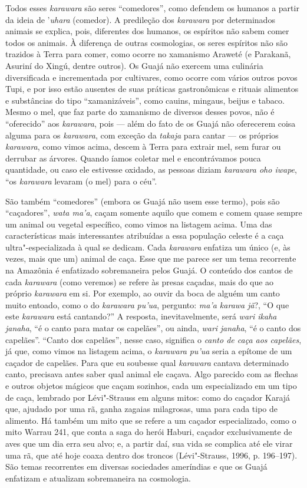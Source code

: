 Todos esses \emph{karawara} são seres ``comedores'', como defendem os
humanos a partir da ideia de '\emph{uhara} (comedor). A predileção dos
\emph{karawara} por determinados animais se explica, pois, diferentes
dos humanos, os espíritos não sabem comer todos os animais. À diferença
de outras cosmologias, os seres espíritos não são trazidos à Terra para
comer, como ocorre no xamanismo Araweté (e Parakanã, Asuriní do Xingú,
dentre outros). Os Guajá não exercem uma culinária diversificada e
incrementada por cultivares, como ocorre com vários outros povos Tupi, e
por isso estão ausentes de suas práticas gastronômicas e rituais
alimentos e substâncias do tipo ``xamanizáveis'', como cauins, mingaus,
beijus e tabaco. Mesmo o mel, que faz parte do xamanismo de diversos
desses povos, não é ``oferecido'' aos \emph{karawara}, pois --- além do fato
de os Guajá não oferecerem coisa alguma para os \emph{karawara}, com
exceção da \emph{takaja} para cantar --- os próprios \emph{karawara}, como
vimos acima, descem à Terra para extrair mel, sem furar ou derrubar as
árvores. Quando íamos coletar mel e encontrávamos pouca quantidade, ou
caso ele estivesse oxidado, as pessoas diziam \emph{karawara oho iwape},
``os \emph{karawara} levaram (o mel) para o céu''.

São também ``comedores'' (embora os Guajá não usem esse termo), pois são
``caçadores'', \emph{wata ma'a}, caçam somente aquilo que comem e comem
quase sempre um animal ou vegetal específico, como vimos na listagem
acima. Uma das características mais interessantes atribuídas a essa
população celeste é a caça ultra"-especializada à qual se dedicam. Cada
\emph{karawara} enfatiza um único (e, às vezes, mais que um) animal de
caça. Esse que me parece ser um tema recorrente na Amazônia é enfatizado
sobremaneira pelos Guajá. O conteúdo dos cantos de cada \emph{karawara}
(como veremos) se refere às presas caçadas, mais do que ao próprio
\emph{karawara} em si. Por exemplo, ao ouvir da boca de alguém um canto
muito entoado, como o do \emph{karawara} \emph{pu'ua}, pergunto:
\emph{ma'a karawa} \emph{jã}?, ``O que este \emph{karawara} está
cantando?'' A resposta, inevitavelmente, será \emph{wari ikaha}
\emph{janaha}, ``é o canto para matar os capelães'', ou ainda, \emph{wari}
\emph{janaha}, ``é o canto dos capelães''. ``Canto dos capelães'', nesse
caso, significa o \emph{canto de caça aos capelães}, já que, como vimos
na listagem acima, o \emph{karawara} \emph{pu'ua} seria a epítome de um
caçador de capelães. Para que eu soubesse qual \emph{karawara} cantava
determinado canto, precisava antes saber qual animal ele caçava. Algo
parecido com as flechas e outros objetos mágicos que caçam sozinhos,
cada um especializado em um tipo de caça, lembrado por Lévi"-Strauss em
alguns mitos: como do caçador Karajá que, ajudado por uma rã, ganha
zagaias milagrosas, uma para cada tipo de alimento. Há também um mito
que se refere a um caçador especializado, como o mito Warrau 241, que
conta a saga do herói Haburi, caçador exclusivamente de aves que um dia
erra seu alvo; e, a partir daí, sua vida se complica até ele virar uma
rã, que até hoje coaxa dentro dos troncos (Lévi"-Strauss, 1996, p.
196--197). São temas recorrentes em diversas sociedades ameríndias e que
os Guajá enfatizam e atualizam sobremaneira na cosmologia.

